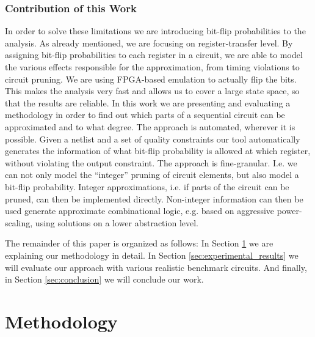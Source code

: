 \documentclass[conference]{IEEEtran}
\begin{document}
\subsubsection*{Contribution of this Work}
In order to solve these limitations we are introducing bit-flip probabilities to the analysis. As already mentioned, we are focusing on register-transfer level. By assigning bit-flip probabilities to each register in a circuit, we are able to model the various effects responsible for the approximation, from timing violations to circuit pruning. We are using FPGA-based emulation to actually flip the bits. This makes the analysis very fast and allows us to cover a large state space, so that the results are reliable. In this work we are presenting and evaluating a methodology in order to find out which parts of a sequential circuit can be approximated and to what degree. The approach is automated, wherever it is possible. Given a netlist and a set of quality constraints our tool automatically generates the information of what bit-flip probability is allowed at which register, without violating the output constraint. The approach is fine-granular. I.e. we can not only model the ``integer'' pruning of circuit elements, but also model a bit-flip probability. Integer approximations, i.e. if parts of the circuit can be pruned, can then be implemented directly. Non-integer information can then be used generate approximate combinational logic, e.g. based on aggressive power-scaling, using solutions on a lower abstraction level.

The remainder of this paper is organized as follows: In Section \ref{sec:methodology} we are explaining our methodology in detail. In Section \ref{sec:experimental_results} we will evaluate our approach with various realistic benchmark circuits. And finally, in Section \ref{sec:conclusion} we will conclude our work.



\section{Methodology}
\label{sec:methodology}
\end{document}
